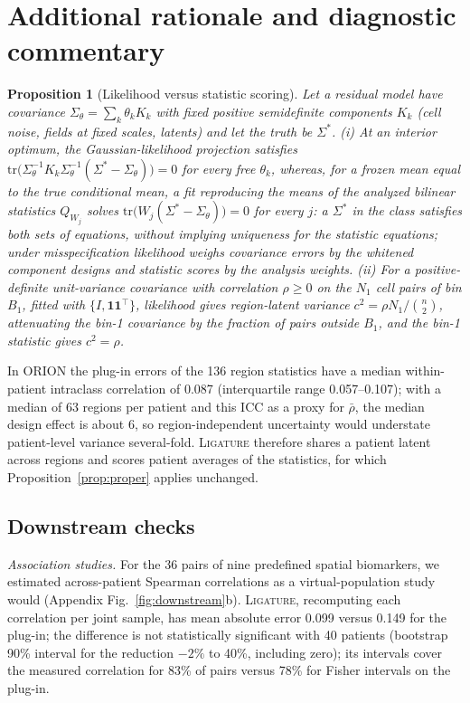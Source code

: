 \documentclass[10pt,letterpaper]{article}
\newtheorem{proposition}{Proposition}
\theoremstyle{definition}
\theoremstyle{remark}
\newcommand{\method}{\textnormal{\textsc{Ligature}}}
\begin{document}
\section{Additional rationale and diagnostic commentary}
\begin{proposition}[Likelihood versus statistic scoring]\label{prop:alloc}
Let a residual model have covariance $\Sigma_\theta=\sum_k\theta_kK_k$ with fixed positive semidefinite components $K_k$ (cell noise, fields at fixed scales, latents) and let the truth be $\Sigma^*$. (i) At an interior optimum, the Gaussian-likelihood projection satisfies $\mathrm{tr}\big(\Sigma_\theta^{-1}K_k\Sigma_\theta^{-1}(\Sigma^*-\Sigma_\theta)\big)=0$ for every free $\theta_k$, whereas, for a frozen mean equal to the true conditional mean, a fit reproducing the means of the analyzed bilinear statistics $Q_{W_j}$ solves $\mathrm{tr}\big(W_j(\Sigma^*-\Sigma_\theta)\big)=0$ for every $j$: a $\Sigma^*$ in the class satisfies both sets of equations, without implying uniqueness for the statistic equations; under misspecification likelihood weighs covariance errors by the whitened component designs and statistic scores by the analysis weights. (ii) For a positive-definite unit-variance covariance with correlation $\rho\ge0$ on the $N_1$ cell pairs of bin $B_1$, fitted with $\{I,\mathbf{1}\mathbf{1}^\top\}$, likelihood gives region-latent variance $c^2=\rho N_1/\binom{n}{2}$, attenuating the bin-1 covariance by the fraction of pairs outside $B_1$, and the bin-1 statistic gives $c^2=\rho$.
\end{proposition}

In ORION the plug-in errors of the 136 region statistics have a median within-patient intraclass correlation of 0.087 (interquartile range 0.057--0.107); with a median of 63 regions per patient and this ICC as a proxy for $\bar\rho$, the median design effect is about 6, so region-independent uncertainty would understate patient-level variance several-fold. \method{} therefore shares a patient latent across regions and scores patient averages of the statistics, for which Proposition~\ref{prop:proper} applies unchanged.


\subsection{Downstream checks}
\emph{Association studies.} For the 36 pairs of nine predefined spatial biomarkers, we estimated across-patient Spearman correlations as a virtual-population study would (Appendix Fig.~\ref{fig:downstream}b). \method{}, recomputing each correlation per joint sample, has mean absolute error 0.099 versus 0.149 for the plug-in; the difference is not statistically significant with 40 patients (bootstrap 90\% interval for the reduction $-2\%$ to 40\%, including zero); its intervals cover the measured correlation for 83\% of pairs versus 78\% for Fisher intervals on the plug-in.
\end{document}
